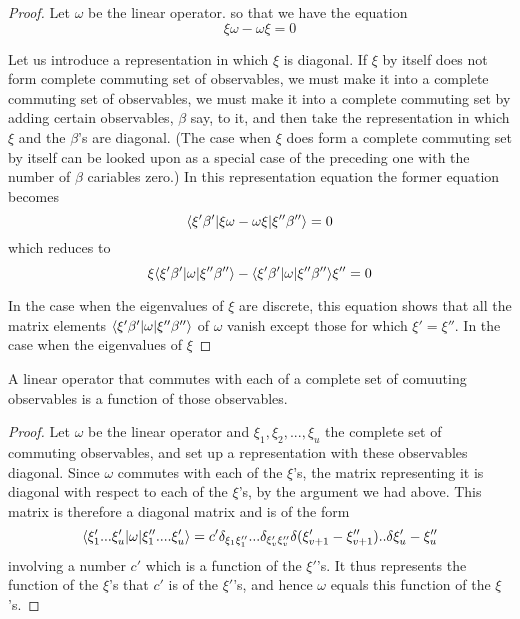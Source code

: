 \begin{proof}
Let $\omega$ be the linear operator. so that we have the equation 
\begin{equation}
\xi\omega - \omega \xi = 0
\end{equation}

Let us introduce a representation in which $\xi$ is diagonal. If $\xi$ by itself does not form complete commuting set of observables, we must make it into a complete commuting set of observables, we must make it into a complete commuting set by adding certain observables, $\beta$ say, to it, and then take the representation in which $\xi$ and the $\beta$'s are diagonal. (The case when $\xi$ does form a complete commuting set by itself can be looked upon as a special case of the preceding one with the number of $\beta$ cariables zero.) In this representation equation the former equation becomes
\begin{equation}
\langle \xi'\beta' |\xi\omega-\omega \xi | \xi''\beta'' \rangle = 0
\end{equation}
which reduces to 
\begin{equation}
\xi\langle \xi'\beta' | \omega | \xi''\beta'' \rangle-\langle \xi'\beta' | \omega | \xi''\beta'' \rangle\xi''=0
\end{equation}

In the case when the eigenvalues of $\xi$ are discrete, this equation shows that all the matrix elements $\langle \xi'\beta' | \omega | \xi''\beta'' \rangle$ of $\omega$ vanish except those for which $\xi'=\xi''$. In the case when the eigenvalues of $\xi$ 

\end{proof}

\begin{theorem}
A linear operator that commutes with each of a complete set of comuuting observables is a function of those observables.
\end{theorem}


\begin{proof}
Let $\omega$ be the linear operator and $\xi_1,\xi_2,...,\xi_u$ the complete set of commuting observables, and set up a representation with these observables diagonal. Since $\omega$ commutes with each of the $\xi$'s, the matrix representing it is diagonal with respect to each of the $\xi$'s, by the argument we had above. This matrix is therefore a diagonal matrix and is of the form
\begin{equation}
\langle \xi_1'...\xi'_u | \omega | \xi_1''....\xi'_u \rangle=c'\delta_{\xi_1\xi_1''}...\delta_{\xi'_v\xi''_v}\delta(\xi'_{v+1}-\xi_{v+1}'')..\delta{\xi'_u-\xi''_u}
\end{equation}
involving a number $c'$ which is a function of the $\xi'$'s. It thus represents the function of the $\xi$'s that $c'$ is of the $\xi'$'s, and hence $\omega$ equals this function of the $\xi$'s.
\end{proof}


